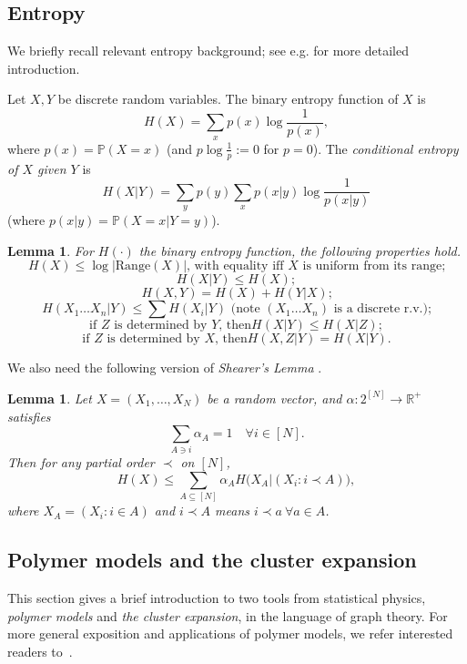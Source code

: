 \documentclass{amsart}
\newtheorem{lem}[thm]{Lemma}
\theoremstyle{definition}
\newcommand{\beq}[1]{\begin{equation}\label{#1}}
\newcommand{\enq}[0]{\end{equation}}
\newcommand{\0}[0]{\emptyset}
\newcommand{\pr}[0]{\mathbb{P}}
\begin{document}
\subsection{Entropy} \label{Entropy}
We briefly recall relevant entropy background; see e.g. \cite{McEliece} for more detailed introduction.

Let $X, Y$ be discrete random variables. The binary entropy function of $X$ is
\[ H(X)=\sum_x p(x) \log {\frac{1}{p(x)}},\]
where $p(x)=\pr(X=x)$ (and $p \log \frac{1}{p} :=0$ for $p=0$).
The \emph{conditional entropy of $X$ given $Y$} is
\beq{condent}
H(X|Y)=\sum_y p(y)\sum_x p(x|y)\log \frac{1}{p(x|y)}
\enq
(where $p(x|y)=\pr(X=x|Y=y)$).



\begin{lem}\label{entropyprop} For $H(\cdot)$ the binary entropy function, the following properties hold.
\beq{entropyprop1} \mbox{$H(X) \le \log |\mbox{Range}(X)|$, with equality iff $X$ is uniform from its range;}\enq
\beq{entropyprop1.5} H(X|Y) \le H(X) ;\enq
\beq{entropyprop2} \mbox{$H(X,Y)=H(X)+H(Y|X)$;}\enq
\beq{entropyprop3} \mbox{$H(X_1\dots X_n|Y) \le \sum H(X_i|Y)$ (note $(X_1\dots X_n)$ is a discrete r.v.);} \enq
\beq{entropyprop4} \mbox{if $Z$ is determined by $Y$, then
$H(X|Y) \le H(X|Z)$}; \enq
\beq{entropyprop5} \mbox{if $Z$ is determined by $X$, then
$H(X,Z|Y) = H(X|Y)$.} \enq
\end{lem}



We also need the following version of \emph{Shearer's Lemma} \cite{Sh}.

\begin{lem}\label{lem:Sh}
Let $X=(X_1, \dots, X_N)$ be a random vector, and $\alpha:2^{[N]}\rightarrow \mathbb R^+$
satisfies
\beq{fractiling}
\sum_{A\ni i}\alpha_A =1 \quad \forall i\in [N].
\enq
Then for any partial order $\prec$ on $[N]$,
\beq{Shearer}
H(X)\leq \sum_{A\subseteq [N]}\alpha_AH\big(X_A|(X_i:i \prec A)\big),
\enq
where $X_A=(X_i:i\in A)$ and $i\prec A$ means $i\prec a\  \forall a\in A$.
\end{lem}



\subsection{Polymer models and the cluster expansion}\label{subsec.polymer intro} 
This section gives a brief introduction to two tools from statistical physics, \textit{polymer models} and \textit{the cluster expansion}, in the language of graph theory. For more general exposition and applications of polymer models, we refer interested readers to~\cite{fernandez2007cluster, JP, kotecky1986cluster}.
\vspace{5pt}
\end{document}
